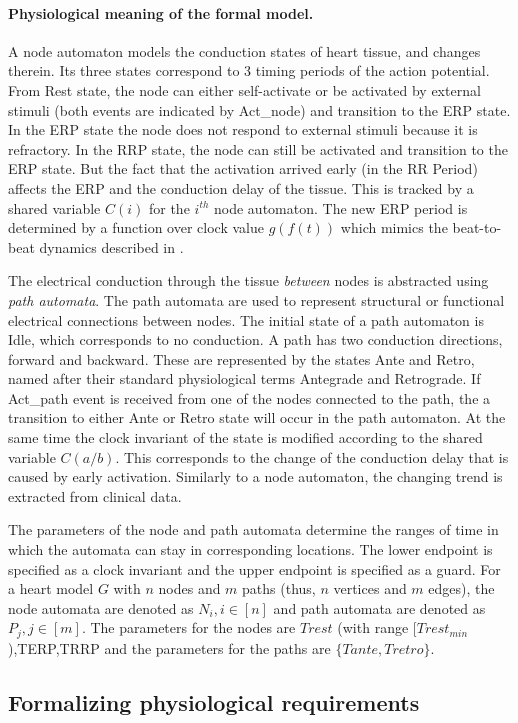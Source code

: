 \paragraph{Physiological meaning of the formal model.}
A node automaton models the conduction states of heart tissue, and changes therein. 
Its three states correspond to 3 timing periods of the action potential. 
From \textsf{Rest} state, the node can either self-activate or be activated by external stimuli (both events are indicated by Act\_node) and transition to the \textsf{ERP} state. 
In the \textsf{ERP} state the node does not respond to external stimuli because it is refractory. 
In the \textsf{RRP} state, the node can still be activated and transition to the \textsf{ERP} state.
But the fact that the activation arrived early (in the RR Period) affects the ERP and the conduction delay of the tissue.  
This is tracked by a shared variable $C(i)$ for the $i^{th}$ node automaton. 
The new ERP period is determined by a function over clock value $g(f(t))$ which mimics the beat-to-beat dynamics described in \cite{josephson}. 

The electrical conduction through the tissue \emph{between} nodes is abstracted using \emph{path automata}. 
The path automata are used to represent structural or functional electrical connections between nodes. 
The initial state of a path automaton is \textsf{Idle}, which corresponds to no conduction. 
A path has two conduction directions, forward and backward.
These are represented by the states Ante and Retro, named after their standard physiological terms Antegrade and Retrograde.
If \textsf{Act\_path} event is received from one of the nodes connected to the path, the a transition to either \textsf{Ante} or \textsf{Retro} state will occur in the path automaton. 
At the same time the clock invariant of the state is modified according to the shared variable $C(a/b)$. 
This corresponds to the change of the conduction delay that is caused by early activation. 
Similarly to a node automaton, the changing trend is extracted from clinical data. 

The parameters of the node and path automata determine the ranges of time in which the automata can stay in corresponding locations. 
The lower endpoint is specified as a clock invariant and the upper endpoint is specified as a guard. 
For a heart model $G$ with $n$ nodes and $m$ paths (thus, $n$ vertices and $m$ edges), the node automata are denoted as $N_i, i\in[n]$ and path automata are denoted as $P_j,j\in[m]$. 
The parameters for the nodes are $Trest$ (with range $[Trest_{min}$),TERP,TRRP and the parameters for the paths are $\{Tante,Tretro\}$. 

\subsection{Formalizing physiological requirements}


